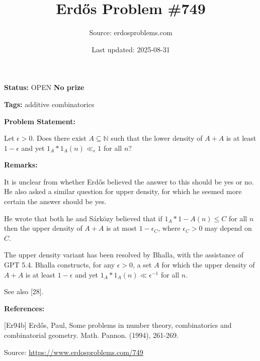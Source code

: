 \documentclass{article}
\title{Erd\H{o}s Problem \#749}
\date{Last updated: 2025-08-31}
\author{Source: erdosproblems.com}
\begin{document}
\maketitle

\noindent\textbf{Status:} OPEN \quad \textbf{No prize}

\noindent\textbf{Tags:} additive combinatorics

\medskip
\noindent\textbf{Problem Statement:}

Let $\epsilon>0$. Does there exist $A\subseteq \mathbb{N}$ such that the lower density of $A+A$ is at least $1-\epsilon$ and yet $1_A\ast 1_A(n) \ll_\epsilon 1$ for all $n$?

\bigskip
\noindent\textbf{Remarks:}

It is unclear from \cite{Er94b} whether Erd\H{o}s believed the answer to this should be yes or no. He also asked a similar question for upper density, for which he seemed more certain the answer should be yes.

He wrote that both he and S\'{a}rk\"{o}zy believed that if $1_A\ast 1-A(n)\leq C$ for all $n$ then the upper density of $A+A$ is at most $1-\epsilon_C$, where $\epsilon_C>0$ may depend on $C$. 

The upper density variant has been resolved by Bhalla, with the assistance of GPT 5.4. Bhalla constructs, for any $\epsilon>0$, a set $A$ for which the upper density of $A+A$ is at least $1-\epsilon$ and yet $1_A\ast 1_A(n)\ll \epsilon^{-1}$ for all $n$.

See also [28].

\bigskip
\noindent\textbf{References:}

[Er94b] Erd\H{o}s, Paul, Some problems in number theory, combinatorics and combinatorial geometry. Math. Pannon. (1994), 261-269.

\bigskip
\noindent\small{Source: \url{https://www.erdosproblems.com/749}}
\end{document}
